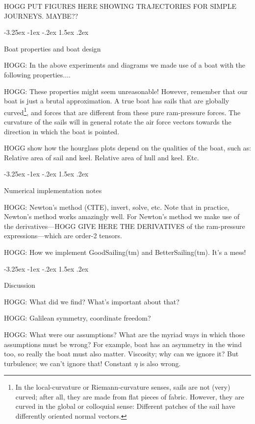\documentclass{article}
\makeatletter
\renewcommand\section{\@startsection {section}{1}{\z@}%
  {-3.25ex \@plus -1ex \@minus -.2ex}%
  {1.5ex \@plus .2ex}%
  {\raggedright\normalfont\large\bfseries}}
\makeatother
\begin{document}
HOGG PUT FIGURES HERE SHOWING TRAJECTORIES FOR SIMPLE JOURNEYS. MAYBE??

\section{Boat properties and boat design}\label{sec:design}

HOGG: In the above experiments and diagrams we made use of a boat with the following properties....

HOGG: These properties might seem unreasonable! However, remember that our boat is just a brutal approximation.
A true boat has sails that are globally curved\footnote{%
In the local-curvature or Riemann-curvature senses, sails are not (very) curved; after all, they are made from flat pieces of fabric.
However, they are curved in the global or colloquial sense: Different patches of the sail have differently oriented normal vectors.},
and forces that are different from these pure ram-pressure forces.
The curvature of the sails will in general rotate the air force vectors towards the direction in which the boat is pointed.

HOGG show how the hourglass plots depend on the qualities of the boat, such as: Relative area of sail and keel. Relative area of hull and keel. Etc.

\section{Numerical implementation notes}\label{sec:implementation}

HOGG: Newton's method (CITE), invert, solve, etc.
Note that in practice, Newton's method works amazingly well.
For Newton's method we make use of the derivatives---HOGG GIVE HERE THE DERIVATIVES of the ram-pressure expressions---which are order-2 tensors.

HOGG: How we implement GoodSailing(tm) and BetterSailing(tm). It's a mess!

\section{Discussion}\label{sec:discussion}

HOGG: What did we find? What's important about that?

HOGG: Galilean symmetry, coordinate freedom?

HOGG: What were our assumptions? What are the myriad ways in which those assumptions must be wrong? For example, boat has an asymmetry in the wind too, so really the boat must also matter. Viscosity; why can we ignore it? But turbulence; we can't ignore that! Constant $\eta$ is also wrong.
\end{document}
